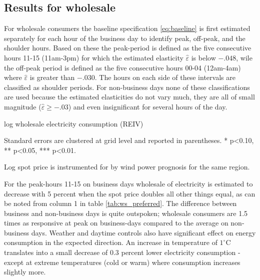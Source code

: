 \label{sec:results}
\subsection{Results for wholesale}
\label{subsec:r_wholesale}
For wholesale consumers the baseline specification \eqref{eq:baseline} is first estimated separately for each hour of the business day to identify peak, off-peak, and the shoulder hours. Based on these the peak-period is defined as the five consecutive hours 11-15 (11am-3pm) for which the estimated elasticity $\widehat{\varepsilon}$ is below $-.048$, wile the off-peak period is defined as the five consecutive hours 00-04 (12am-4am) where $\widehat{\varepsilon}$ is greater than $-.030$. The hours on each side of these intervals are classified as shoulder periods. For non-business days none of these classifications are used because the estimated elasticities do not vary much, they are all of small magnitude ($\widehat{\varepsilon}\geq-.03$)  and even insignificant for several hours of the day.

\begin{table}[H]
\begin{threeparttable}
  \centering
  \caption{log wholesale electricity consumption (REIV)}
  \footnotesize
        
    \begin{tablenotes}
    \item Standard errors are clustered at grid level and reported in parentheses. * p<0.10, ** p<0.05, *** p<0.01.
    \item Log spot price is instrumented for by wind power prognosis for the same region.
     \end{tablenotes}
  \label{tab:ws_preferred}
\end{threeparttable}
\end{table}
\noindent
For the peak-hours 11-15 on business days wholesale of electricity is estimated to decrease with 5 percent when the spot price doubles all other things equal, as can be noted from column 1 in table \ref{tab:ws_preferred}. The difference between business and non-business days is quite outspoken; wholesale consumers are 1.5 times as responsive at peak on business-days compared to the average on non-business days. Weather and daytime controls also have significant effect on energy consumption in the expected direction. An increase in temperature of  $1^{\circ}$C translates into a small decrease of 0.3 percent lower electricity consumption - except at extreme temperatures (cold or warm) where consumption increases slightly more.

